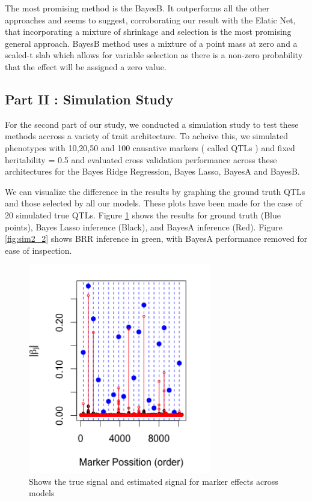 \documentclass{sig-alternate-05-2015}
\begin{document}
The most promising method is the BayesB. It outperforms all the other approaches and seems to suggest, corroborating our result with the Elatic Net, that
incorporating a mixture of shrinkage and selection is the most promising general approach. BayesB method uses a mixture of a point mass at zero
and a scaled-t slab which allows for variable selection as there is a non-zero probability that the effect will be assigned a zero value.


\subsection{Part II : Simulation Study}

For the second part of our study, we conducted a simulation study to test these methods accross a variety of trait architecture.
To acheive this, we simulated phenotypes with 10,20,50 and 100 causative markers ( called QTLs ) and fixed heritability = 0.5
and evaluated cross validation performance across these architectures for the Bayes Ridge Regression, Bayes Lasso, BayesA and BayesB.

We can visualize the difference in the results by graphing the ground truth QTLs and those selected by all our models. These plots have been
made for the case of 20 simulated true QTLs. Figure \ref{fig:sim2_1}  shows the results for ground truth (Blue points), Bayes Lasso inference (Black),
and BayesA inference (Red). Figure \ref{fig:sim2_2} shows BRR inference in green, with BayesA performance removed for ease of inspection.

\begin{figure}
  \includegraphics[width=8cm]{./Images/sim2_1.png}
  \centering
  \caption{Shows the true signal and estimated signal for marker effects across models}
  \label{fig:sim2_1}
\end{figure}
\end{document}
